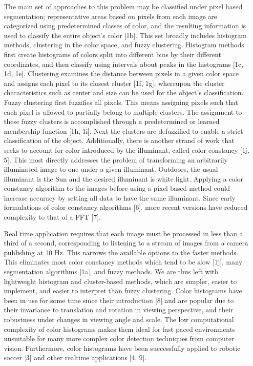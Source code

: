 \documentclass{article} %
\begin{document}
The main set of approaches to this problem may be classified under pixel based segmentation; representative areas based on pixels from each image are categorized using predetermined classes of color, and the resulting information is used to classify the entire object's color [1b]. This set broadly includes histogram methods, clustering in the color space, and fuzzy clustering. Histogram methods first create histograms of colors split into different bins by their different coordinates, and then classify using intervals about peaks in the histograms [1c, 1d, 1e]. Clustering examines the distance between pixels in a given color space and assigns each pixel to its closest cluster [1f, 1g], whereupon the cluster characteristics such as center and size can be used for the object's classification. Fuzzy clustering first fuzzifies all pixels. This means assigning pixels such that each pixel is allowed to partially belong to multiple clusters. The assignment to these fuzzy clusters is accomplished through a predetermined or learned membership function [1h, 1i]. Next the clusters are defuzzified to enable a strict classification of the object. Additionally, there is another strand of work that seeks to account for color introduced by the illuminant, called color constancy [1j, 5]. This most directly addresses the problem of transforming an arbitrarily illuminated image to one under a given illuminant. Outdoors, the usual illuminant is the Sun and the desired illuminant is white light. Applying a color constancy algorithm to the images before using a pixel based method could increase accuracy by setting all data to have the same illuminant. Since early formulations of color constancy algorithms [6], more recent versions have reduced complexity to that of a FFT [7].

Real time application requires that each image must be processed in less than a third of a second, corresponding to listening to a stream of images from a camera publishing at 10 Hz. This narrows the available options to the faster methods. This eliminates most color constancy methods which tend to be slow [1j], many segmentation algorithms [1a], and fuzzy methods. We are thus left with lightweight histogram and cluster-based methods, which are simpler, easier to implement, and easier to interpret than fuzzy clustering. Color histograms have been in use for some time since their introduction [8] and are popular due to their invariance to translation and rotation in viewing perspective, and their robustness under changes in viewing angle and scale. The low computational complexity of color histograms makes them ideal for fast paced environments unsuitable for many more complex color detection techniques from computer vision. Furthermore, color histograms have been successfully applied to robotic soccer [3] and other realtime applications [4, 9].
\end{document}
